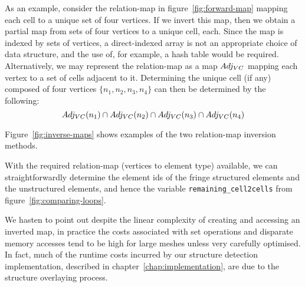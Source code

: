 As an example, consider the relation-map in figure~\ref{fig:forward-map} mapping each cell to a unique set of four vertices. If we invert this map, then we obtain a partial map from sets of four vertices to a unique cell, each. Since the map is indexed by sets of vertices, a direct-indexed array is not an appropriate choice of data structure, and the use of, for example, a hash table would be required. Alternatively, we may represent the relation-map as a map $Adj_{VC}$ mapping each vertex to a set of cells adjacent to it. Determining the unique cell (if any) composed of four vertices $\{ n_1, n_2, n_3, n_4\}$ can then be determined by the following:
$$Adj_{VC}(n_1) \cap Adj_{VC}(n_2) \cap Adj_{VC}(n_3) \cap Adj_{VC}(n_4)$$

Figure~\ref{fig:inverse-maps} shows examples of the two relation-map inversion methods.

With the required relation-map (vertices to element type) available, we can straightforwardly determine the element ids of the fringe structured elements and the unstructured elements, and hence the variable \lstinline|remaining_cell2cells| from figure~\ref{fig:comparing-loops}.

We hasten to point out despite the linear complexity of creating and accessing an inverted map, in practice the costs associated with set operations and disparate memory accesses tend to be high for large meshes unless very carefully optimised. In fact, much of the runtime costs incurred by our structure detection implementation, described in chapter~\ref{chap:implementation}, are due to the structure overlaying process.


